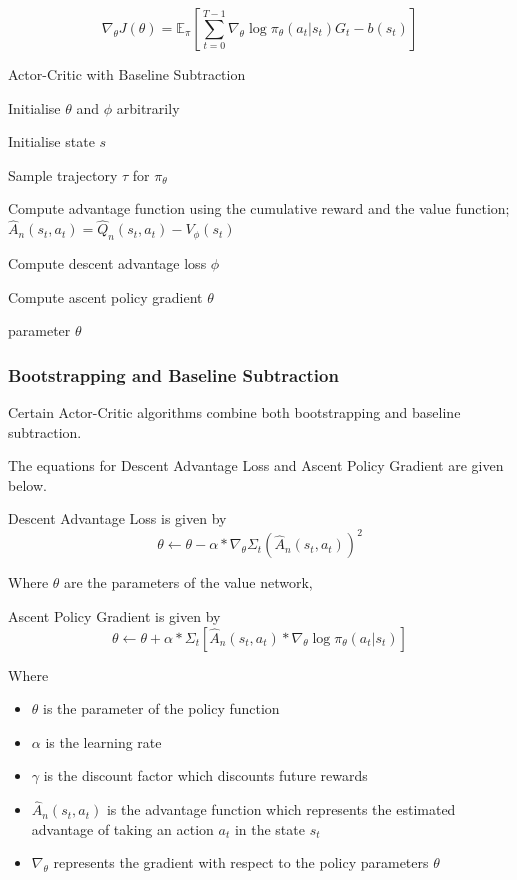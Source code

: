 \documentclass{article}
\begin{document}
\begin{equation*}
\nabla_\theta J(\theta) = \mathbb{E}_\pi[\sum _{t=0}^{T-1}  \nabla_\theta\log\pi_\theta (a_t|s_t)G_t - b(s_t)]
\end{equation*}
\begin{algorithm}[htbp]
\caption{Actor-Critic with Baseline Subtraction}
\SetAlgoLined
\DontPrintSemicolon
\small %
Initialise $\theta$ and $\phi$ arbitrarily\;\\
{
    Initialise state $s$\;
     \item Sample trajectory $\tau$ for $\pi_\theta$
     \item
    {
     \item Compute advantage function using the cumulative reward and the value function;
     \(\hat{A}_n(s_t,a_t) = \hat{Q}_n(s_t,a_t) - V_\phi(s_t)\)
    }
    \item Compute descent advantage loss $\phi$
    \item Compute ascent policy gradient $\theta$
}
\State \Return parameter $\theta$
\end{algorithm}
\subsubsection{Bootstrapping and Baseline Subtraction}
Certain Actor-Critic algorithms combine both bootstrapping and baseline subtraction. 

The equations for Descent Advantage Loss and Ascent Policy Gradient are given below. 
\par Descent Advantage Loss is given by
\begin{equation*}
\theta \leftarrow \theta - \alpha * \nabla_\theta\Sigma_t(\hat{A}_n(s_t,a_t))^2
\end{equation*}

Where $\theta$ are the parameters of the value network, 

Ascent Policy Gradient is given by
\begin{equation*}
\theta \leftarrow \theta + \alpha * \Sigma_t[\hat{A}_n(s_t,a_t)*\nabla_\theta\log\pi_\theta(a_t|s_t)]
\end{equation*}

Where 
\begin{itemize}[itemsep=0pt]
\renewcommand\labelitemi{.}
\item $\theta$ is the parameter of the policy function
\item $\alpha$ is the learning rate
\item $\gamma$ is the discount factor which discounts future rewards
\item $\hat{A}_n(s_t,a_t)$ is the advantage function which represents the estimated advantage of taking an action $a_t$ in the state $s_t$
\item $\nabla_\theta$ represents the gradient with respect to the policy parameters $\theta$
\end{itemize}
\end{document}
